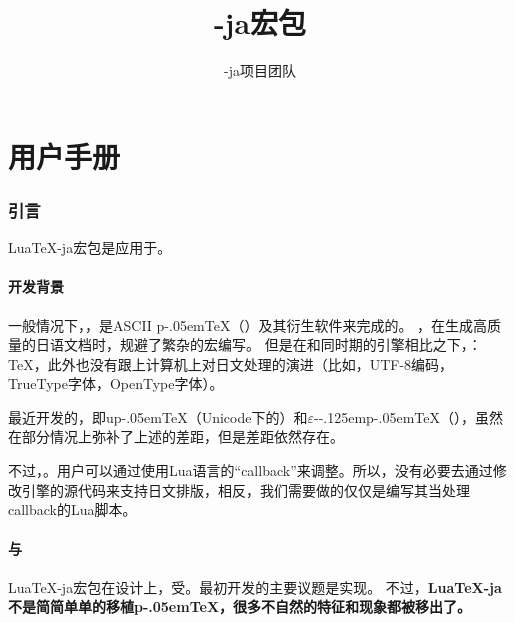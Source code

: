\documentclass{ltjarticle}
\title{\LuaTeX-ja宏包}
\author{\LuaTeX-ja项目团队}
\date{}
\DeclareRobustCommand\eTeX{\ensuremath{\varepsilon}-\kern-.125em\TeX}
\DeclareRobustCommand\LuaTeX{Lua\TeX}
\DeclareRobustCommand\pTeX{p\kern-.05em\TeX}
\DeclareRobustCommand\upTeX{up\kern-.05em\TeX}
\DeclareRobustCommand\epTeX{\ensuremath{\varepsilon}-\kern-.125em\pTeX}
\begin{document}
\maketitle
\tableofcontents
\part{用户手册}
\section{引言}
\LuaTeX-ja宏包是应用于。
\subsection{开发背景}
一般情况下，，是ASCII \pTeX（）及其衍生软件来完成的。
，在生成高质量的日语文档时，规避了繁杂的宏编写。
但是在和同时期的引擎相比之下，：\TeX，此外也没有跟上计算机上对日文处理的演进（比如，UTF-8编码，TrueType字体，OpenType字体）。

最近开发的，即\upTeX（Unicode下的）和\epTeX（），虽然在部分情况上弥补了上述的差距，但是差距依然存在。

不过，。用户可以通过使用Lua语言的“callback”来调整。所以，没有必要去通过修改引擎的源代码来支持日文排版，相反，我们需要做的仅仅是编写其当处理callback的Lua脚本。
\subsection{与}
\LuaTeX-ja宏包在设计上，受。最初开发的主要议题是实现。
不过，{\bf\LuaTeX-ja不是简简单单的移植\pTeX，很多不自然的特征和现象都被移出了。}
\end{document}
